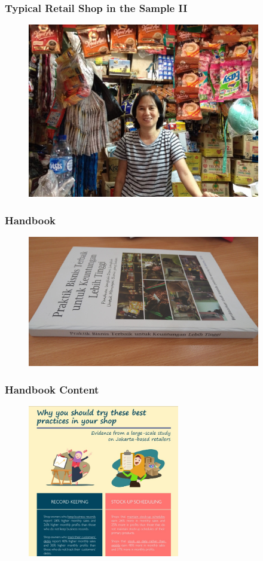 \documentclass[hideothersubsections, usenames,dvipsnames,10pt]{beamer}
\begin{document}
\begin{frame}
\frametitle{Typical Retail Shop in the Sample II}

\begin{figure}[htbp]
	\centering
		\includegraphics[width=4in]{pics/retailer2.jpg}
	\label{height}
\end{figure}
\end{frame}


\begin{frame}
\frametitle{Handbook}

\begin{figure}[htbp]
	\centering
		\includegraphics[width=4in]{pics/handbook.jpg}
	
	\label{height}
\end{figure}
\end{frame}


\begin{frame}
\frametitle{Handbook Content}
\begin{figure}[htbp]
	\centering
		\includegraphics[width=2.6in]{pics/Handbook_return.jpg}
	
	\label{height}
\end{figure}
\end{frame}
\end{document}

